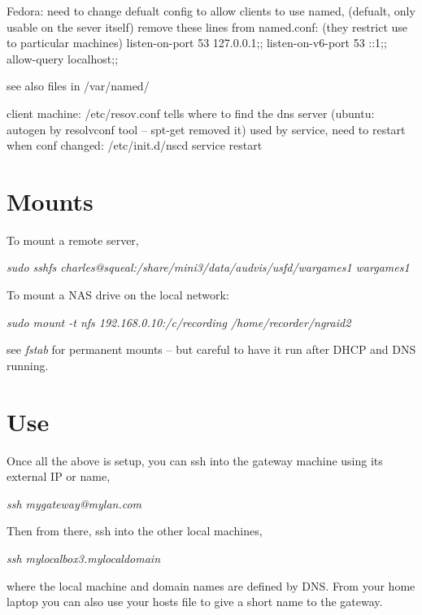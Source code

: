 \documentclass[oneside,english]{scrbook}
\begin{document}
    Fedora: need to change defualt config to allow clients to use named, (defualt, only usable on the sever itself)
        remove these lines from named.conf:  (they restrict use to particular machines)
            listen-on-port 53 {127.0.0.1;};
            listen-on-v6-port 53 {::1;};
            allow-query {localhost;};

    see also files in
        /var/named/

    client machine: /etc/resov.conf tells where to find the dns server  (ubuntu: autogen by resolvconf tool -- spt-get removed it)
        used by service, need to restart when conf changed:
            /etc/init.d/nscd service restart

\section{Mounts}

To mount a remote server,

\emph{sudo sshfs charles@squeal:/share/mini3/data/audvis/usfd/wargames1
wargames1 }

To mount a NAS drive on the local network:

\emph{sudo mount -t nfs 192.168.0.10:/c/recording /home/recorder/ngraid2 }

see \emph{fstab} for permanent mounts -- but careful to have it run
after DHCP and DNS running.

\section{Use}

Once all the above is setup, you can ssh into the gateway machine
using its external IP or name,

\emph{ssh mygateway@mylan.com}

Then from there, ssh into the other local machines,

\emph{ssh mylocalbox3.mylocaldomain}

where the local machine and domain names are defined by DNS. From
your home laptop you can also use your hosts file to give a short
name to the gateway.
\end{document}
